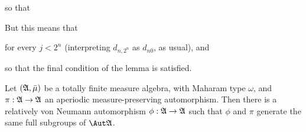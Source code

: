 {
     
\noindent so that
     
     
\noindent But this means that
     
     
\noindent for every $j<2^n$ (interpreting $d_{n,2^n}$ as $d_{n0}$, as
usual), and
     
     
\noindent so that the final condition of the lemma is satisfied.
}%
     
Let $(\frak A,\bar\mu)$ be a totally finite
measure algebra, with Maharam type $\omega$,
and $\pi:\frak A\to\frak A$ an aperiodic measure-preserving
automorphism.   Then there is a relatively
von Neumann automorphism $\phi:\frak A\to\frak A$ such that $\phi$ and
$\pi$ generate the same full subgroups of $\Aut\frak A$.
     
